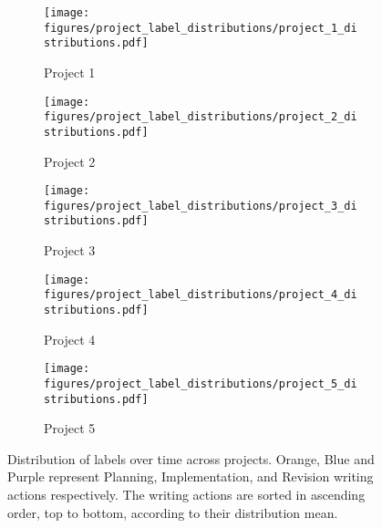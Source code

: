 \begin{figure*}
    \centering
    \begin{subfigure}{0.32\textwidth}
        \texttt{[image: figures/project\_label\_distributions/project\_1\_distributions.pdf]}
        \caption{Project 1}
    \end{subfigure}
    \begin{subfigure}{0.32\textwidth}
        \texttt{[image: figures/project\_label\_distributions/project\_2\_distributions.pdf]}
        \caption{Project 2}
    \end{subfigure}
    \begin{subfigure}{0.32\textwidth}
        \texttt{[image: figures/project\_label\_distributions/project\_3\_distributions.pdf]}
        \caption{Project 3}
    \end{subfigure}
    \begin{subfigure}{0.32\textwidth}
        \texttt{[image: figures/project\_label\_distributions/project\_4\_distributions.pdf]}
        \caption{Project 4}
    \end{subfigure}
    \begin{subfigure}{0.32\textwidth}
        \texttt{[image: figures/project\_label\_distributions/project\_5\_distributions.pdf]}
        \caption{Project 5}
    \end{subfigure}
    \caption{Distribution of labels over time across projects. Orange, Blue and Purple represent Planning, Implementation, and Revision writing actions respectively. The writing actions are sorted in ascending order, top to bottom, according to their distribution mean.}
    \label{fig:label-dist-all}
\end{figure*}

